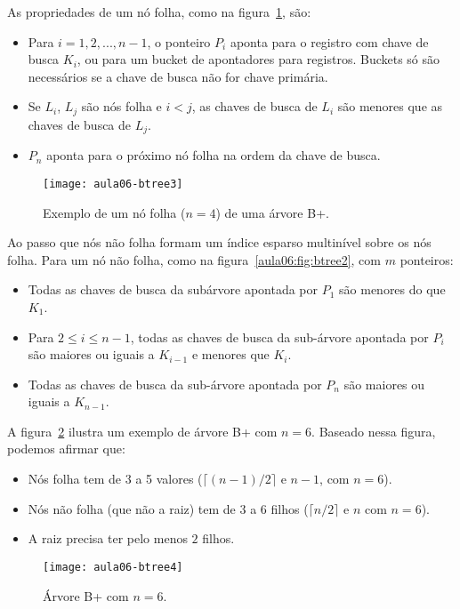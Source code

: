 As propriedades de um nó folha, como na figura~\ref{aula06:fig:btree3}, são:
\begin{itemize}
\item Para $i = 1, 2, ..., n-1$, o ponteiro $P_i$ aponta
para o registro com chave de busca $K_i$, ou para um bucket de apontadores para registros.
Buckets só são necessários se a chave de busca não for chave primária.
\item Se $L_i$, $L_j$ são nós folha e $i < j$, as chaves de busca de $L_i$
são menores que as chaves de busca de $L_j$.
\item $P_n$ aponta para o próximo nó folha na ordem da chave de busca.
\end{itemize}
%
\begin{figure}[!htb]
\centering
\texttt{[image: aula06-btree3]}
\caption{Exemplo de um nó folha ($n = 4$) de uma árvore B+.}
\label{aula06:fig:btree3}
\end{figure}

Ao passo que nós não folha formam um índice esparso multinível sobre os nós folha.
Para um nó não folha, como na figura~\ref{aula06:fig:btree2}, com $m$ ponteiros:
\begin{itemize}
\item Todas as chaves de busca da subárvore apontada por $P_1$ são 
menores do que $K_1$.
\item Para $2 \leq i \leq n-1$, todas as chaves de busca da sub-árvore apontada
por $P_i$ são maiores ou iguais a $K_{i-1}$ e menores que $K_i$.
\item Todas as chaves de busca da sub-árvore apontada por $P_n$ são maiores
ou iguais a $K_{n-1}$.
\end{itemize}

A figura~\ref{aula06:fig:btree4} ilustra um exemplo de árvore B+ com $n = 6$.
Baseado nessa figura, podemos afirmar que:
\begin{itemize}
\item Nós folha tem de 3 a 5 valores ($\lceil (n-1)/2 \rceil$ e $n-1$, com $n=6$).
\item Nós não folha (que não a raiz) tem de 3 a 6 filhos ($\lceil n/2 \rceil$ e
$n$ com $n=6$).
\item A raiz precisa ter pelo menos $2$ filhos.
\end{itemize}
%
\begin{figure}[!htb]
\centering
\texttt{[image: aula06-btree4]}
\caption{Árvore B+ com $n = 6$.}
\label{aula06:fig:btree4}
\end{figure}

